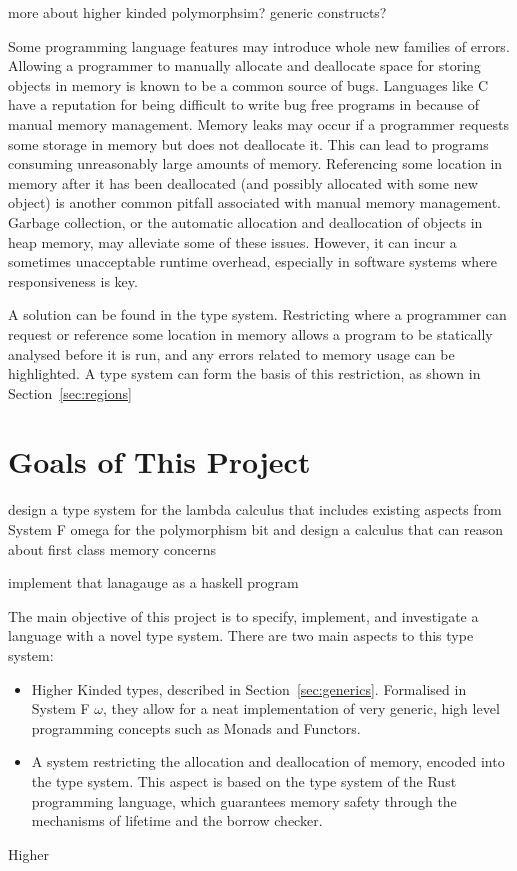 more about higher kinded polymorphsim? generic constructs?

Some programming language features may introduce whole new families of errors.
Allowing a programmer to manually allocate and deallocate space for storing
objects in memory is known to be a common source of bugs. Languages like C have a
reputation for being difficult to write bug free programs in because of manual memory
management. Memory leaks may occur if a programmer requests some storage in
memory but does not deallocate it. This can lead to programs consuming unreasonably
large amounts of memory. Referencing some location in memory after it has been
deallocated (and possibly allocated with some new object) is another common pitfall
associated with manual memory management. Garbage collection, or the automatic
allocation and deallocation of objects in heap memory, may alleviate some of these issues.
However, it can incur a sometimes unacceptable runtime overhead, especially in
software systems where responsiveness is key.

A solution can be found in the type system. Restricting where a programmer
can request or reference some location in memory allows a program to be statically
analysed before it is run, and any errors related to memory usage can be highlighted.
A type system can form the basis of this restriction, as shown in Section~\ref{sec:regions}

\section{Goals of This Project}
design a type system for the lambda calculus that includes existing aspects
from System F omega for the polymorphism bit and design a calculus that can
reason about first class memory concerns

implement that lanagauge as a haskell program

The main objective of this project is to specify, implement, and investigate a
language with a novel type system. There are two main aspects to this type
system:
\begin{itemize}
    \item Higher Kinded types, described in Section~\ref{sec:generics}.
        Formalised in System F $\omega$, they allow for a neat implementation of
        very generic, high level programming concepts such as Monads and
        Functors.
    \item A system restricting the allocation and deallocation of memory,
        encoded into the type system. This aspect is based on the type system
        of the Rust programming language, which guarantees memory safety through
        the mechanisms of lifetime and the borrow checker.
\end{itemize}
Higher


